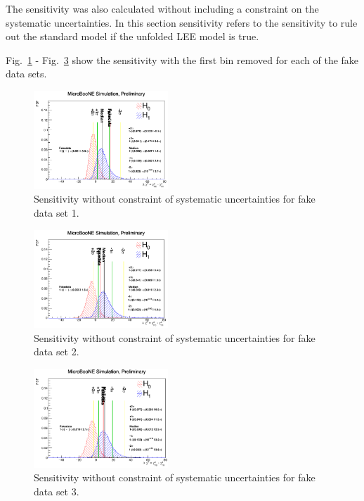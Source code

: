 The sensitivity was also calculated without including a constraint on the systematic uncertainties. In this section sensitivity refers to the sensitivity to rule out the standard model if the unfolded LEE model is true.  

Fig.~\ref{fig:fda:noconstrain_fd1} - Fig.~\ref{fig:fda:noconstrain_fd3} show the sensitivity with the first bin removed for each of the fake data sets. 

\begin{figure}[H]
\begin{center}
\includegraphics[width=0.45\textwidth]{Fakedata/appendix/noconstrain_fd1.pdf}
\caption{\label{fig:fda:noconstrain_fd1} Sensitivity without constraint of systematic uncertainties for fake data set 1.}
\end{center}
\end{figure}

\begin{figure}[H]
\begin{center}
\includegraphics[width=0.45\textwidth]{Fakedata/appendix/noconstrain_fd2.pdf}
\caption{\label{fig:fda:noconstrain_fd2} Sensitivity without constraint of systematic uncertainties for fake data set 2.}
\end{center}
\end{figure}

\begin{figure}[H]
\begin{center}
\includegraphics[width=0.45\textwidth]{Fakedata/appendix/noconstrain_fd3.pdf}
\caption{\label{fig:fda:noconstrain_fd3} Sensitivity without constraint of systematic uncertainties for fake data set 3.}
\end{center}
\end{figure}

